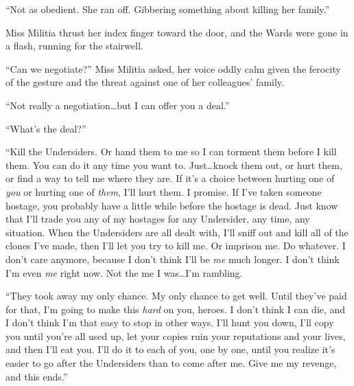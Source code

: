 ``Not as obedient.  She ran off.  Gibbering something about killing her family.''



Miss Militia thrust her index finger toward the door, and the Wards were gone in a flash, running for the stairwell.



``Can we negotiate?''  Miss Militia asked, her voice oddly calm given the ferocity of the gesture and the threat against one of her colleagues' family.



``Not really a negotiation\ldots but I can offer you a deal.''



``What's the deal?''



``Kill the Undersiders.  Or hand them to me so I can torment them before I kill them.  You can do it any time you want to.  Just\ldots knock them out, or hurt them, or find a way to tell me where they are.  If it's a choice between hurting one of \emph{you} or hurting one of \emph{them}, I'll hurt them.  I promise.  If I've taken someone hostage, you probably have a little while before the hostage is dead.  Just know that I'll trade you any of my hostages for any Undersider, any time, any situation.  When the Undersiders are all dealt with, I'll sniff out and kill all of the clones I've made, then I'll let you try to kill me.  Or imprison me.  Do whatever.  I don't care anymore, because I don't think I'll be \emph{me} much longer.  I don't think I'm even \emph{me} right now.  Not the me I was\ldots I'm rambling.



``They took away my only chance.  My only chance to get well.  Until they've paid for that, I'm going to make this \emph{hard} on you, heroes.  I don't think I can die, and I don't think I'm that easy to stop in other ways.  I'll hunt you down, I'll copy you until you're all used up, let your copies ruin your reputations and your lives, and then I'll eat you.  I'll do it to each of you, one by one, until you realize it's easier to go after the Undersiders than to come after me.  Give me my revenge, and this ends.''





